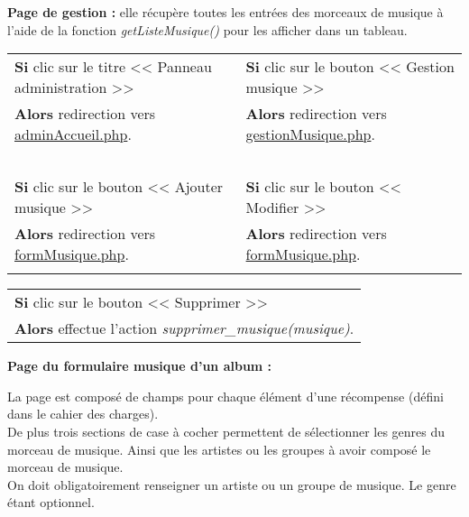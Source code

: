             \begin{paragraphe}
                \textbf{Page de gestion :} elle récupère toutes les entrées des morceaux de musique à l'aide de la fonction \emph{getListeMusique()} pour les afficher dans un tableau.
            \end{paragraphe}

            \begin{center}
                \begin{tabular}{l | l}
                    \textbf{Si} clic sur le titre << Panneau administration >> & \textbf{Si} clic sur le bouton << Gestion musique >> \\
                    \textbf{Alors} redirection vers \underline{adminAccueil.php}. & \textbf{Alors} redirection vers \underline{gestionMusique.php}. \\ \\

                    \textbf{Si} clic sur le bouton << Ajouter musique >> & \textbf{Si} clic sur le bouton << Modifier >> \\
                    \textbf{Alors} redirection vers \underline{formMusique.php}. & \textbf{Alors} redirection vers \underline{formMusique.php}. \\ \\
                \end{tabular}

                \begin{tabular}{l}
                    \textbf{Si} clic sur le bouton << Supprimer >> \\
                    \textbf{Alors} effectue l'action \emph{supprimer\_musique(musique)}.
                \end{tabular}
            \end{center}
            
        
            \begin{paragraphe}
                \textbf{Page du formulaire musique d'un album :}
            \end{paragraphe}
            
            \begin{paragraphe}
                La page est composé de champs pour chaque élément d'une récompense (défini dans le cahier des charges). \\
                De plus trois sections de case à cocher permettent de sélectionner les genres du morceau de musique. Ainsi que les artistes ou les groupes à avoir composé le morceau de musique. \\
                On doit obligatoirement renseigner un artiste ou un groupe de musique. Le genre étant optionnel.
            \end{paragraphe}
            

